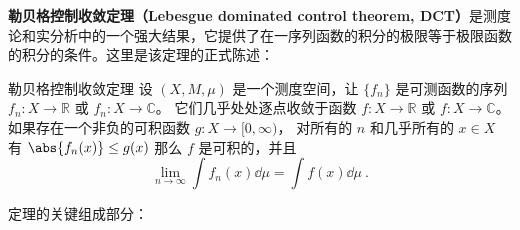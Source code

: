 
\begin{issues}
\issueDraft
\end{issues}


\textbf{勒贝格控制收敛定理（Lebesgue dominated control theorem, DCT）}是测度论和实分析中的一个强大结果，它提供了在一序列函数的积分的极限等于极限函数的积分的条件。这里是该定理的正式陈述：

\begin{theorem}{勒贝格控制收敛定理}
设 $(X,M,\mu)$ 是一个测度空间，让 $\{f_n\}$ 是可测函数的序列 $f_n: X\to\mathbb R$ 或 $f_n:X\to\mathbb C$。 它们几乎处处逐点收敛于函数 $f: X\to\mathbb R$ 或 $f:X\to\mathbb C$。 如果存在一个非负的可积函数 $g:X\to[0,\infty)$， 对所有的 $n$ 和几乎所有的 $x\in X$ 有 $\abs{f_n(x)}\leq g(x)$ 那么 $f$ 是可积的，并且
\begin{equation}
\lim_{n\to\infty}\int f_n(x)\dd{\mu} = \int f(x)\dd{\mu}~.
\end{equation}
\end{theorem}

定理的关键组成部分：
